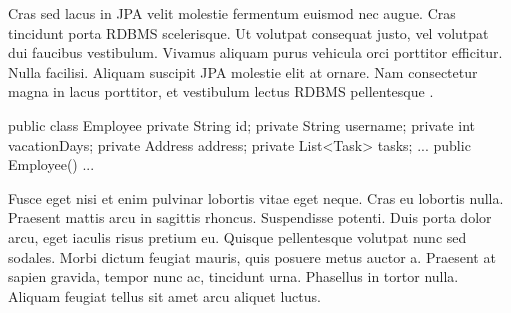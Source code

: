 Cras sed lacus in \ac{JPA} velit molestie fermentum euismod nec augue. Cras tincidunt porta \ac{RDBMS} scelerisque. Ut volutpat consequat justo, vel volutpat dui faucibus vestibulum. Vivamus aliquam purus vehicula orci porttitor efficitur. Nulla facilisi. Aliquam suscipit \ac{JPA} molestie elit at ornare. Nam consectetur magna in lacus porttitor, et vestibulum lectus \ac{RDBMS} pellentesque \autocite{Bloch2018}.

\begin{javacode}[caption=Employee class with \acs{JPA} mapping annotations., label={lst:jpa-employee-entity}]
public class Employee {
    private String id;
    private String username;
    private int vacationDays;
    private Address address;
    private List<Task> tasks;
    ...
    public Employee() {}
    ...
}
\end{javacode}

Fusce eget nisi et enim pulvinar lobortis vitae eget neque. Cras eu lobortis nulla. Praesent mattis arcu in sagittis rhoncus. Suspendisse potenti. Duis porta dolor arcu, eget iaculis risus pretium eu. Quisque pellentesque volutpat nunc sed sodales. Morbi \textcite{Bloch2018} dictum feugiat mauris, quis posuere metus auctor a. Praesent at sapien gravida, tempor nunc ac, tincidunt urna. Phasellus in tortor nulla. Aliquam feugiat tellus sit amet arcu aliquet luctus. 

